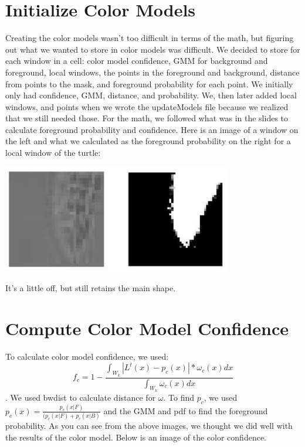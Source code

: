 \documentclass{article}
\begin{document}
	\section{Initialize Color Models}
	Creating the color models wasn’t too difficult in terms of the math, but figuring out what we wanted to store in color models was difficult. We decided to store for each window in a cell: color model confidence, GMM for background and foreground, local windows, the points in the foreground and background, distance from points to the mask, and foreground probability for each point. We initially only had confidence, GMM, distance, and probability. We, then later added local windows, and points when we wrote the updateModels file because we realized that we still needed those. For the math, we followed what was in the slides to calculate foreground probability and confidence.
	Here is an image of a window on the left and what we calculated as the foreground probability on the right for a local window of the turtle:
	
	\begin{center}
		\includegraphics[width=100mm]{img/i3}
	\end{center}

	It’s a little off, but still retains the main shape.
	
	\section{Compute Color Model Confidence}
	
	To calculate color model confidence, we used: $$f_c = 1 - \frac{\int_{W_k}^{}|L^t(x)-p_c(x)|*\omega_c(x)dx}{\int_{W_k}^{}\omega_c(x)dx}$$. We used bwdist to calculate distance for $\omega$. To find $p_c$, we used $p_c (x)= \frac{p_c (x | F)}{(p_c (x | F)+p_c (x | B)}$ and the GMM and pdf to find the foreground probability. As you can see from the above images, we thought we did well with the results of the color model. Below is an image of the color confidence.
	
\end{document}
